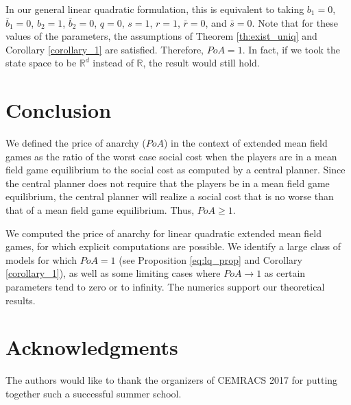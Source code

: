 \documentclass[11pt]{article}
\begin{document}
In our general linear quadratic formulation, this is equivalent to taking $b_1=0$, $\bar{b}_1=0$, $b_2=1$, $\bar{b}_2=0$, $q=0$, $s=1$, $r=1$, $\bar{r}=0$, and $\bar{s}=0$. Note that for these values of the parameters, the assumptions of Theorem \ref{th:exist_uniq} and Corollary \ref{corollary_1} are satisfied. Therefore, $PoA=1$. In fact, if we took the state space to be $\mathbb{R}^d$ instead of $\mathbb{R}$, the result would still hold.


\section{\textbf{Conclusion}} \label{sec:conclusion}
We defined the price of anarchy ($PoA$) in the context of extended mean field games as the ratio of the worst case social cost when the players are in a mean field game equilibrium to the social cost as computed by a central planner. Since the central planner does not require that the players be in a mean field game equilibrium, the central planner will realize a social cost that is no worse than that of a mean field game equilibrium. Thus, $PoA \geq 1$.

We computed the price of anarchy for linear quadratic extended mean field games, for which explicit computations are possible. We identify a large class of models for which $PoA=1$ (see Proposition \ref{eq:lq_prop} and Corollary \ref{corollary_1}), as well as some limiting cases where $PoA \rightarrow 1$ as certain parameters tend to zero or to infinity. The numerics support our theoretical results.

\section{\textbf{Acknowledgments}}
The authors would like to thank the organizers of CEMRACS 2017 for putting together such a successful summer school.
\end{document}
